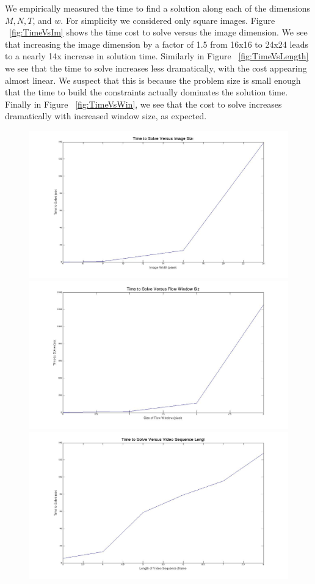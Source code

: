 We empirically measured the time to find a solution along each of the dimensions $M, N, T$, and $w$. For simplicity we considered only square images. Figure ~\ref{fig:TimeVsIm} shows the time cost to solve versus the image dimension. We see that increasing the image dimension by a factor of 1.5 from 16x16 to 24x24 leads to a nearly 14x increase in solution time. Similarly in Figure ~\ref{fig:TimeVsLength} we see that the time to solve increases less dramatically, with the cost appearing almost linear. We suspect that this is because the problem size is small enough that the time to build the constraints actually dominates the solution time. Finally in Figure ~\ref{fig:TimeVsWin}, we see that the cost to solve increases dramatically with increased window size, as expected.


\begin{figure}[t]
\begin{centering}
\includegraphics[scale=0.125]{figures/time_vs_imsize.jpg}
\includegraphics[scale=0.125]{figures/time_vs_window.jpg}
\includegraphics[scale=0.125]{figures/time_vs_length.jpg}

\end{centering}
\end{figure}
